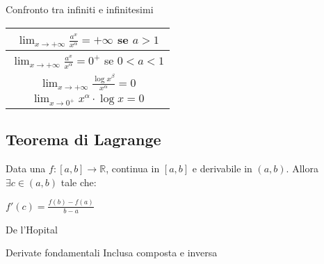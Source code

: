 Confronto tra infiniti e infinitesimi
\begin{tabular}{|c|}
	\hline
	$\lim_{x \rightarrow +\infty} \frac{a^x}{x^\alpha} = + \infty$ se $a>1$ \\
	\hline
	$\lim_{x \rightarrow +\infty} \frac{a^x}{x^\alpha} = 0^+$ se $0<a<1$ \\
	\hline
	$\lim_{x \rightarrow +\infty} \frac{{\log{x}}^\beta}{x^\alpha} = 0$ \\
	\hline
	$\lim_{x \rightarrow 0^+} x^\alpha \cdot \log{x} = 0$ \\
	\hline
\end{tabular}

\subsection{Teorema di Lagrange}
\begin{theorem}
	Data una $f: [a,b] \to \mathbb{R}$, continua in $[a,b]$ e derivabile in $(a,b)$. Allora $\exists c \in (a,b)$ tale che:
	\begin{center}\vspace{-5pt}
		$f'(c) = \frac{f(b) - f(a)}{b - a}$
	\end{center}
\end{theorem}

De l'Hopital

Derivate fondamentali
Inclusa composta e inversa